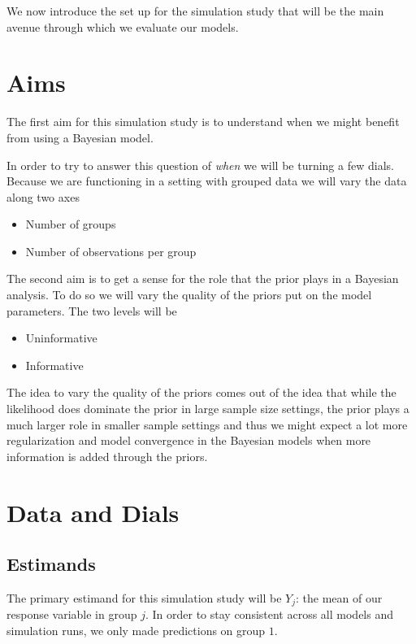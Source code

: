 \documentclass[12pt,twoside]{reedthesis}
\providecommand{\tightlist}{%
  \setlength{\itemsep}{0pt}\setlength{\parskip}{0pt}}
\begin{document}
We now introduce the set up for the simulation study that will be the main avenue through which we evaluate our models.

\hypertarget{aims}{%
\section{Aims}\label{aims}}

The first aim for this simulation study is to understand when we might benefit from using a Bayesian model.

In order to try to answer this question of \emph{when} we will be turning a few dials. Because we are functioning in a setting with grouped data we will vary the data along two axes
\begin{itemize}
\tightlist
\item
  Number of groups
\item
  Number of observations per group
\end{itemize}
The second aim is to get a sense for the role that the prior plays in a Bayesian analysis. To do so we will vary the quality of the priors put on the model parameters. The two levels will be
\begin{itemize}
\tightlist
\item
  Uninformative
\item
  Informative
\end{itemize}
The idea to vary the quality of the priors comes out of the idea that while the likelihood does dominate the prior in large sample size settings, the prior plays a much larger role in smaller sample settings and thus we might expect a lot more regularization and model convergence in the Bayesian models when more information is added through the priors.

\hypertarget{data-and-dials}{%
\section{Data and Dials}\label{data-and-dials}}

\hypertarget{estimands}{%
\subsection{Estimands}\label{estimands}}

The primary estimand for this simulation study will be \(Y_j\): the mean of our response variable in group \(j\). In order to stay consistent across all models and simulation runs, we only made predictions on group \(1\).
\end{document}
